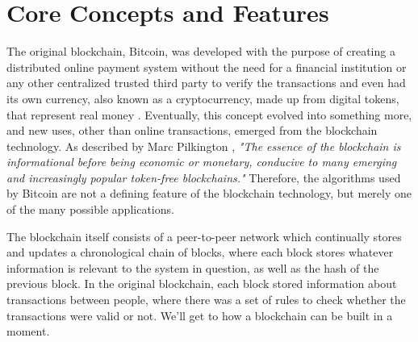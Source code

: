 \section{Core Concepts and Features}

The original blockchain, Bitcoin, was developed with the purpose of creating a distributed online payment system without the need for a financial institution or any other centralized trusted third party to verify the transactions and even had its own currency, also known as a cryptocurrency, made up from digital tokens, that represent real money . Eventually, this concept evolved into something more, and new uses, other than online transactions, emerged from the blockchain technology. As described by Marc Pilkington \cite{Pilkington2015}, \textit{"The essence of the blockchain is informational before being economic or monetary, conducive to many emerging and increasingly popular token-free blockchains."}  Therefore, the algorithms used by Bitcoin are not a defining feature of the blockchain technology, but merely one of the many possible applications.
    
    The blockchain itself consists of a peer-to-peer network which continually stores and updates a chronological chain of blocks, where each block stores whatever information is relevant to the system in question, as well as the hash of the previous block. In the original blockchain, each block stored information about transactions between people, where there was a set of rules to check whether the transactions were valid or not. We'll get to how a blockchain can be built in a moment.
    

